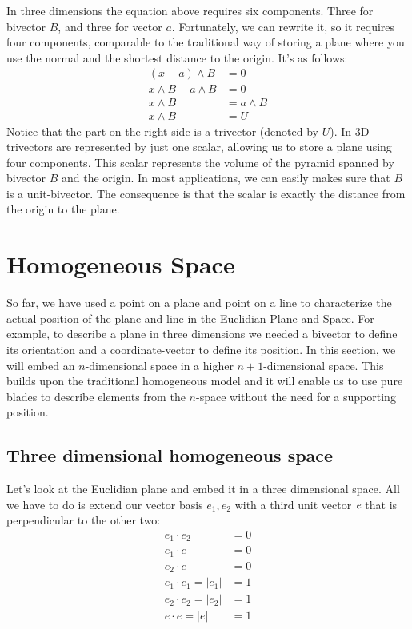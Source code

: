 \documentclass[10pt]{report}
\begin{document}
In three dimensions the equation above requires six components.
Three for bivector $B$, and three for vector $a$. Fortunately, we
can rewrite it, so it requires four components, comparable to the
traditional way of storing a plane where you use the normal and
the shortest distance to the origin. It's as follows:
\begin{align*}
    (x-a)\wedge B         &= 0 \\
    x\wedge B - a\wedge B &= 0 \\
        x\wedge B &= a\wedge B \\
        x\wedge B &= U
\end{align*}
Notice that the part on the right side is a trivector (denoted by
$U$). In 3D trivectors are represented by just one scalar,
allowing us to store a plane using four components. This scalar
represents the volume of the pyramid spanned by bivector $B$ and
the origin. In most applications, we can easily makes sure that
$B$ is a unit-bivector. The consequence is that the scalar is
exactly the distance from the origin to the plane.

\newpage

\section{Homogeneous Space}

So far, we have used a point on a plane and point on a line to
characterize the actual position of the plane and line in the
Euclidian Plane and Space. For example, to describe a plane in
three dimensions we needed a bivector to define its orientation
and a coordinate-vector to define its position. In this section,
we will embed an $n$-dimensional space in a higher
$n+1$-dimensional space. This builds upon the traditional
homogeneous model and it will enable us to use pure blades to
describe elements from the $n$-space without the need for a
supporting position.

\subsection{Three dimensional homogeneous space}

Let's look at the Euclidian plane and embed it in a three
dimensional space. All we have to do is extend our vector basis
${e_1, e_2}$ with a third unit vector $\emph{e}$ that is
perpendicular to the other two:
\begin{align*}
        e_1\cdot e_2 &= 0   \\
        e_1\cdot e &= 0     \\
        e_2\cdot e &= 0     \\
        e_1\cdot e_1 = |e_1| &= 1   \\
        e_2\cdot e_2 = |e_2| &= 1   \\
        e\cdot e = |e| &= 1
\end{align*}
\end{document}
